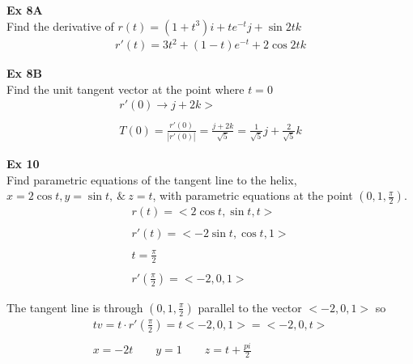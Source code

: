 \documentclass{article}
\begin{document}
  \textbf{Ex 8A}\\
  Find the derivative of $ r(t) =(1+t^{3})i+te^{-t}j+\sin{2t}k$
  \[
      \begin{gathered}
        \boxed{r'(t)=3t^{2}+(1-t)e^{-t}+2\cos{2t}k} 
      \end{gathered}
  \]

  \textbf{Ex 8B}\\
  Find the unit tangent vector at the point where $ t=0 $
  \[
      \begin{gathered}
      r'(0)\to j +2k>\\
      ~\\
    T(0)=\frac{r'(0)}{| r'(0) |}=\frac{j+2k}{\sqrt{5}}=\boxed{\frac{1}{\sqrt{5}}j+\frac{2}{\sqrt{5}}k} 
      \end{gathered}
  \]

  \textbf{Ex 10}\\
  Find parametric equations of the tangent line to the helix, $ x=2\cos{t},y=\sin{t},~\&~ z=t$,  with parametric equations at the point $ (0,1,\frac{\pi}{2}) $.
  \[
      \begin{gathered}
      r(t)=< 2\cos{t}, \sin{t}, t >\\
      ~\\
      r'(t)=< -2\sin{t}, \cos{t}, 1 >\\
      ~\\
      t=\frac{\pi}{2}\\
      ~\\
      r'(\frac{\pi}{2})=< -2, 0, 1 > 
      \end{gathered}
  \]

  The tangent line is through $ (0,1,\frac{\pi}{2}) $ parallel to the vector $ < -2, 0, 1 >$ so
  \[
      \begin{gathered}
      tv=t \cdot r'(\frac{\pi}{2}) = t< -2, 0, 1 > = < -2, 0, t >\\
      ~\\
      x=-2t \qquad y=1 \qquad z=t+\frac{pi}{2}  
      \end{gathered}
  \]
\end{document}
